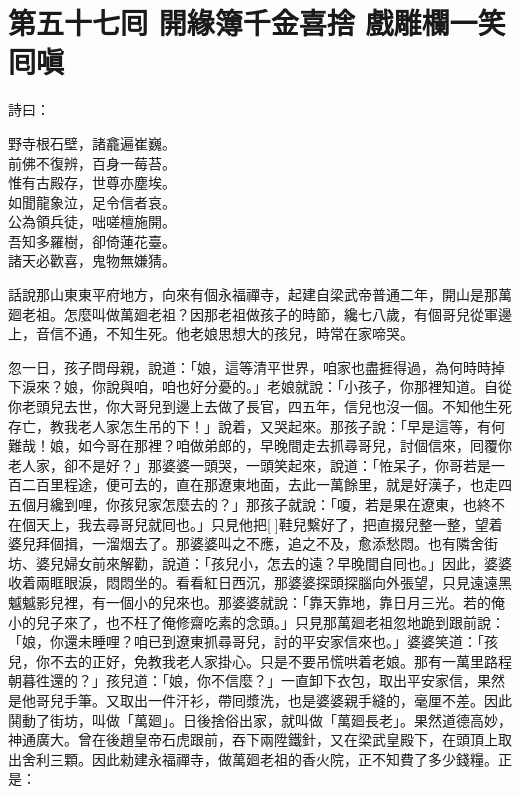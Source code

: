
\chapter*{第五十七囘 開緣簿千金喜捨 戲雕欄一笑囘嗔}


詩曰：

\begin{myquote}
野寺根石壁，諸龕遍崔巍。\\前佛不復辨，百身一莓苔。\\惟有古殿存，世尊亦塵埃。\\如聞龍象泣，足令信者哀。\\公為領兵徒，咄嗟檀施開。\\吾知多羅樹，卻倚蓮花臺。\\諸天必歡喜，鬼物無嫌猜。
\end{myquote}

話說那山東東平府地方，向來有個永福禪寺，起建自梁武帝普通二年，開山是那萬廻老祖。怎麼叫做萬廻老祖？因那老祖做孩子的時節，纔七八歲，有個哥兒從軍邊上，音信不通，不知生死。他老娘思想大的孩兒，時常在家啼哭。

忽一日，孩子問母親，說道：「娘，這等清平世界，咱家也盡捱得過，為何時時掉下淚來？娘，你說與咱，咱也好分憂的。」老娘就說：「小孩子，你那裡知道。自從你老頭兒去世，你大哥兒到邊上去做了長官，四五年，信兒也沒一個。不知他生死存亡，教我老人家怎生吊的下！」說着，又哭起來。那孩子說：「早是這等，有何難哉！娘，如今哥在那裡？咱做弟郎的，早晚間走去抓尋哥兒，討個信來，囘覆你老人家，卻不是好？」那婆婆一頭哭，一頭笑起來，說道：「恠呆子，你哥若是一百二百里程途，便可去的，直在那遼東地面，去此一萬餘里，就是好漢子，也走四五個月纔到哩，你孩兒家怎麼去的？」那孩子就說：「嗄，若是果在遼東，也終不在個天上，我去尋哥兒就囘也。」只見他把[]鞋兒繫好了，把直掇兒整一整，望着婆兒拜個揖，一溜烟去了。那婆婆叫之不應，追之不及，愈添愁悶。也有隣舍街坊、婆兒婦女前來解勸，說道：「孩兒小，怎去的遠？早晚間自囘也。」因此，婆婆收着兩眶眼淚，悶悶坐的。看看紅日西沉，那婆婆探頭探腦向外張望，只見遠遠黑魆魆影兒裡，有一個小的兒來也。那婆婆就說：「靠天靠地，靠日月三光。若的俺小的兒子來了，也不枉了俺修齋吃素的念頭。」只見那萬廻老祖忽地跪到跟前說：「娘，你還未睡哩？咱已到遼東抓尋哥兒，討的平安家信來也。」{}婆婆笑道：「孩兒，你不去的正好，免教我老人家掛心。只是不要吊慌哄着老娘。那有一萬里路程朝暮徃還的？」孩兒道：「娘，你不信麼？」一直卸下衣包，取出平安家信，果然是他哥兒手筆。又取出一件汗衫，帶囘漿洗，也是婆婆親手縫的，毫厘不差。因此鬨動了街坊，叫做「萬廻」。日後捨俗出家，就叫做「萬廻長老」。果然道德高妙，神通廣大。曾在後趙皇帝石虎跟前，吞下兩陞鐵針，又在梁武皇殿下，在頭頂上取出舍利三顆。因此勑建永福禪寺，做萬廻老祖的香火院，正不知費了多少錢糧。正是：

